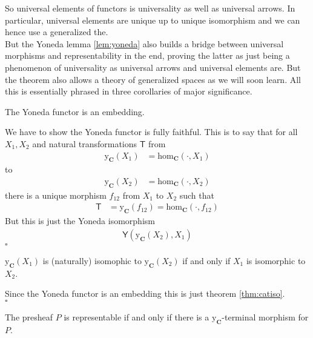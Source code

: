 So universal elements of functors is universality as well as universal arrows. In particular, universal elements are unique up to unique isomorphism and we can hence use a generalized {\glqq}the{\grqq}.
\\
But the Yoneda lemma \ref{lem:yoneda} also builds a bridge between universal morphisms and representability in the end, proving the latter as just being a phenomenon of universality as universal arrows and universal elements are. But the theorem also allows a theory of {\glqq}generalized spaces{\grqq} as we will soon learn. All this is essentially phrased in three corollaries of major significance.
\\
\begin{cor}
\label{cor:yoneda1}
The Yoneda functor is an embedding.
\end{cor}
\begin{prf}
We have to show the Yoneda functor is fully faithful. This is to say that for all $X_{1},X_{2}$ and natural transformations $\mathsf{T}$ from
\begin{align*}
  \mathrm{y}_{\mathbf{C}}(X_{1})
  &=
  \mathrm{hom}_{\mathbf{C}}(\cdot,X_{1})
\end{align*}
to
\begin{align*}
  \mathrm{y}_{\mathbf{C}}(X_{2})
  &=
  \mathrm{hom}_{\mathbf{C}}(\cdot,X_{2})
\end{align*}
there is a unique morphism $f_{12}$ from $X_{1}$ to $X_{2}$ such that
\begin{align*}
  \mathsf{T}
  &=
  \mathrm{y}_{\mathbf{C}}(f_{12})
  =
  \mathrm{hom}_{\mathbf{C}}(\cdot,f_{12})
\end{align*}
But this is just the Yoneda isomorphism
\begin{align*}
  \mathsf{Y}(\mathrm{y}_{\mathbf{C}}(X_{2}),X_{1})
\end{align*}
\phantom{proven}
\hfill
$\square$
\end{prf}
\begin{cor}
\label{cor:yoneda2}
$\mathrm{y}_{\mathbf{C}}(X_{1})$ is (naturally) isomophic to $\mathrm{y}_{\mathbf{C}}(X_{2})$ if and only if $X_{1}$ is isomorphic to $X_{2}$.
\end{cor}
\begin{prf}
Since the Yoneda functor is an embedding this is just theorem \ref{thm:catiso}.
\\
\phantom{proven}
\hfill
$\square$
\end{prf}
\begin{cor}
\label{cor:yoneda3}
The presheaf $P$ is representable if and only if there is a $\mathrm{y}_{\mathbf{C}}$-terminal morphism for $P$.
\end{cor}
